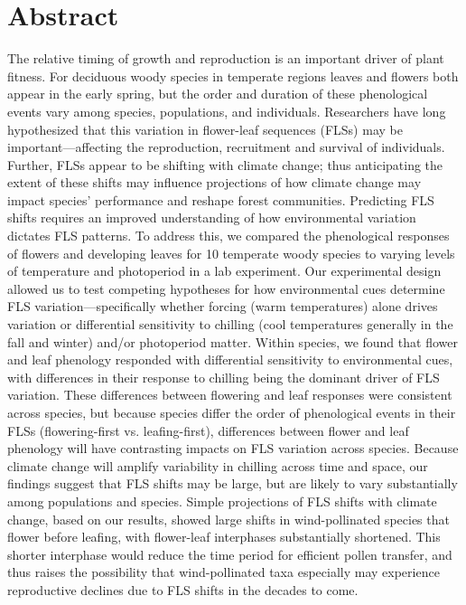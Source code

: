 \documentclass[12pt]{article}\usepackage[]{graphicx}\usepackage[]{color}
\begin{document}
\section*{Abstract} 
The relative timing of growth and reproduction is an important driver of plant fitness. For deciduous woody species in temperate regions leaves and flowers both appear in the early spring, but the order and duration of these phenological events vary among species, populations, and individuals. Researchers have long hypothesized that this variation in flower-leaf sequences (FLSs) may be important---affecting the reproduction, recruitment and survival of individuals. Further, FLSs appear to be shifting with climate change; thus anticipating the extent of these shifts may influence projections of how climate change may impact species' performance and reshape forest communities. Predicting FLS shifts requires an improved understanding of how environmental variation dictates FLS patterns. To address this, we compared the phenological responses of flowers and developing leaves for 10 temperate woody species to varying levels of temperature and photoperiod in a lab experiment. Our experimental design allowed us to test competing hypotheses for how environmental cues determine FLS variation---specifically whether forcing (warm temperatures) alone drives variation or differential sensitivity to chilling (cool temperatures generally in the fall and winter) and/or photoperiod matter. Within species, we found that flower and leaf phenology responded with differential sensitivity to environmental cues, with differences in their response to chilling being the dominant driver of FLS variation. These differences between flowering and leaf responses were consistent across species, but because species differ the order of phenological events in their FLSs (flowering-first vs. leafing-first), differences between flower and leaf phenology will have contrasting impacts on FLS variation across species. Because climate change will amplify variability in chilling across time and space, our findings suggest that FLS shifts may be large, but are likely to vary substantially among populations and species. Simple projections of FLS shifts with climate change, based on our results, showed large shifts in wind-pollinated species that flower before leafing, with flower-leaf interphases substantially shortened. This shorter interphase would reduce the time period for efficient
pollen transfer, and thus raises the possibility that wind-pollinated taxa especially may experience reproductive declines due to FLS shifts in the decades to come.
\end{document}
